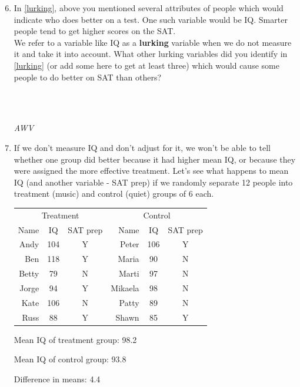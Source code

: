 \begin{enumerate}
  \setcounter{enumi}{5}
  \item In \ref{lurking}, above you mentioned several attributes of
    people which would indicate who does better on a test.  One such
    variable would be IQ.  Smarter people tend to get higher scores on
    the SAT.  
    \\ We refer to a variable like IQ as a {\bf lurking} variable when
    we do not measure it and take it into account.  What other lurking
    variables did you identify in \ref{lurking} (or add some here to
    get at least three)
    which would cause some people to do better on SAT than others?
\begin{students}
        \vspace{1cm}\\
\end{students}
\begin{key}
  \\ {\it  AWV}
\end{key}
  \item  If we don't measure IQ and don't adjust for it, we won't be
    able to tell whether one group did better because it had higher
    mean IQ, or because they were assigned the more effective treatment.  
    Let's see what happens to mean IQ (and another variable - SAT
    prep) if we randomly separate 12
    people into treatment (music) and  control (quiet) groups of 6 each.

    
\begin{tabular}{|r|c|c||r|c|c|}\hline
      \multicolumn{3}{|c||}{Treatment} &\multicolumn{3}{|c|}{Control}\\
  Name  & IQ & SAT prep & Name & IQ &SAT prep \\
\hline
Andy & 104 & Y &Peter &106 &Y\\
\hline
Ben  & 118 & Y & Maria & 90 &N\\
\hline
Betty & 79 & N & Marti & 97 &N \\
\hline
Jorge & 94 & Y & Mikaela& 98 &N\\
\hline
 Kate  & 106&N &  Patty &89 &N\\
\hline
Russ  &  88 &Y & Shawn &85 &Y\\ \hline
\end{tabular} \hfill
\begin{minipage}{.40\linewidth}
  Mean IQ of treatment group: 98.2

  Mean IQ of control group: 93.8

  Difference in means:  4.4
\end{minipage}


\end{enumerate}
